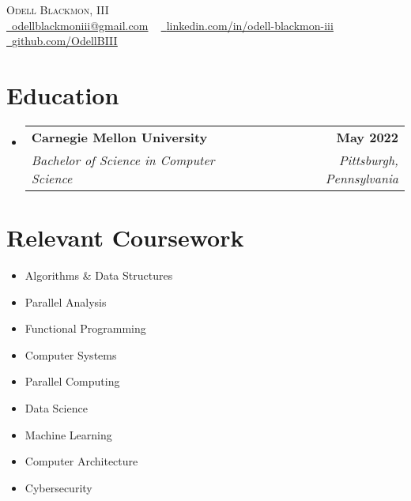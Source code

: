 \documentclass[letterpaper,11pt]{article}
\makeatletter
\newcommand{\resumeSubheading}[4]{
  \vspace{-2pt}\item
    \begin{tabular*}{1.0\textwidth}[t]{l@{\extracolsep{\fill}}r}
      \textbf{#1} & \textbf{\small #2} \\
      \textit{\small#3} & \textit{\small #4} \\
    \end{tabular*}\vspace{-7pt}
}
\newcommand{\resumeSubHeadingListStart}{\begin{itemize}[leftmargin=0.0in, label={}]}
\newcommand{\resumeSubHeadingListEnd}{\end{itemize}}
\makeatother
\begin{document}

\begin{center}
    {\Huge \scshape Odell Blackmon, III} \\ \vspace{1pt}
    \small \href{mailto:odellblackmoniii@gmail.com}{\raisebox{-0.2\height}\faEnvelope\  \underline{odellblackmoniii@gmail.com}} ~ 
    \href{https://linkedin.com/in/odell-blackmon-iii}{\raisebox{-0.2\height}\faLinkedin\ \underline{linkedin.com/in/odell-blackmon-iii}}  ~
    \href{https://github.com/OdellBIII}{\raisebox{-0.2\height}\faGithub\ \underline{github.com/OdellBIII}}
    \vspace{-8pt}
\end{center}


\section{Education}
  \resumeSubHeadingListStart
    \resumeSubheading
      {Carnegie Mellon University}{May 2022}
      {Bachelor of Science in Computer Science}{Pittsburgh, Pennsylvania}
  \resumeSubHeadingListEnd

\section{Relevant Coursework}
        \begin{multicols}{3}
            \begin{itemize}[itemsep=-5pt, parsep=3pt]
                \item\small Algorithms \& Data Structures
                \item Parallel Analysis
                \item Functional Programming
                \item Computer Systems
                \item Parallel Computing
                \item Data Science
                \item Machine Learning
                \item Computer Architecture
                \item Cybersecurity
            \end{itemize}
        \end{multicols}
        \vspace*{2.0\multicolsep}
\end{document}
